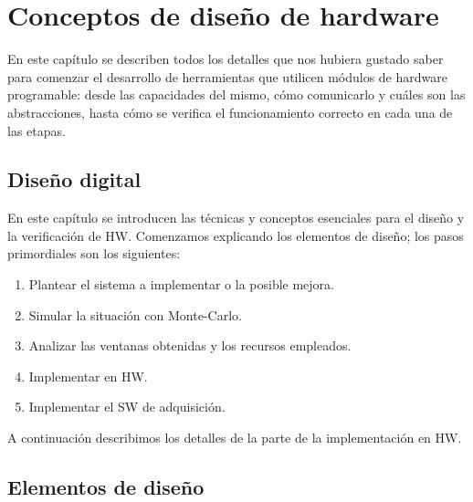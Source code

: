 \chapter{Conceptos de diseño de hardware}
\label{C:intro-hw}

\graphicspath{{figs/cap5/}{figs/comunes/}}

\begin{destacado}
En este capítulo se describen todos los detalles que nos hubiera gustado saber
para comenzar el desarrollo de herramientas que utilicen módulos de hardware
programable: desde las capacidades del mismo, cómo comunicarlo y cuáles son las
abstracciones, hasta cómo se verifica el funcionamiento correcto en cada una de
las etapas.
\end{destacado}

\section{Diseño digital}
\label{S:intro-hw-diseno-digital}

En este capítulo se introducen las técnicas y conceptos esenciales para el
diseño y la verificación de HW. Comenzamos explicando los elementos de diseño;
los pasos primordiales son los siguientes:
\begin{enumerate}
  \item Plantear el sistema a implementar o la posible mejora.
  \item Simular la situación con Monte-Carlo.
  \item Analizar las ventanas obtenidas y los recursos empleados.
  \item Implementar en HW.
  \item Implementar el SW de adquisición.
\end{enumerate}
A continuación describimos los detalles de la parte de la implementación en HW.

\section{Elementos de diseño}
\label{S:intro-hw-elementos}

